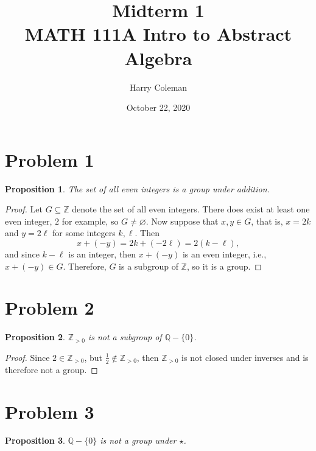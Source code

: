 \documentclass[12pt]{article}
\newtheorem{proposition}{Proposition}
\newcommand{\<}{\left\langle}
\renewcommand{\>}{\right\rangle}
\newcommand{\Z}{\mathbb{Z}}
\newcommand{\Q}{\mathbb{Q}}
\let\emptyset\varnothing
\begin{document}
 
\title{Midterm 1\\
    \large MATH 111A Intro to Abstract Algebra
}
\author{Harry Coleman}
\date{October 22, 2020}
\maketitle

\section*{Problem 1}

\begin{proposition}
    The set of all even integers is a group under addition.
\end{proposition}

\begin{proof}
    Let $G\subseteq\Z$ denote the set of all even integers. There does exist at least one even integer, $2$ for example, so $G\ne\emptyset$. Now suppose that $x,y\in G$, that is, $x=2k$ and $y=2\ell$ for some integers $k,\ell$. Then
    \[x+(-y) = 2k + (-2\ell) = 2(k-\ell),\]
    and since $k-\ell$ is an integer, then $x+(-y)$ is an even integer, i.e., $x+(-y)\in G$. Therefore, $G$ is a subgroup of $\Z$, so it is a group.
    
\end{proof}


\section*{Problem 2}

\begin{proposition}
    $\Z_{>0}$ is not a subgroup of $\Q-\{0\}$.
\end{proposition}

\begin{proof}
    Since $2\in\Z_{>0}$, but $\frac12\notin\Z_{>0}$, then $\Z_{>0}$ is not closed under inverses and is therefore not a group.
    
\end{proof}

\section*{Problem 3}

\begin{proposition}
    $\Q-\{0\}$ is not  a group under $\star$.
\end{proposition}
\end{document}
